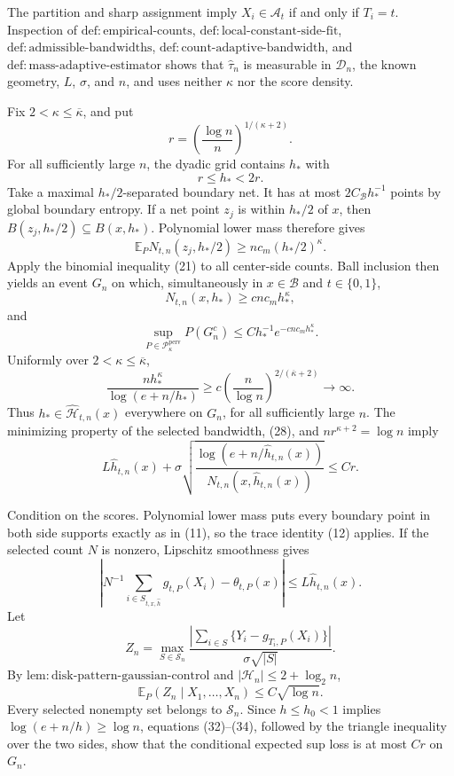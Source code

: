 The partition and sharp assignment imply \(X_i\in\mathcal A_t\) if and only if \(T_i=t\).  Inspection of \(\mathrm{def:empirical\text{-}counts}\), \(\mathrm{def:local\text{-}constant\text{-}side\text{-}fit}\), \(\mathrm{def:admissible\text{-}bandwidths}\), \(\mathrm{def:count\text{-}adaptive\text{-}bandwidth}\), and \(\mathrm{def:mass\text{-}adaptive\text{-}estimator}\) shows that \(\widehat\tau_n\) is measurable in \(\mathcal D_n\), the known geometry, \(L\), \(\sigma\), and \(n\), and uses neither \(\kappa\) nor the score density.

Fix \(2<\kappa\le\overline\kappa\), and put
\[
 r=\left(\frac{\log n}{n}\right)^{1/(\kappa+2)}.
\]
For all sufficiently large \(n\), the dyadic grid contains \(h_*\) with
\[
 r\le h_*<2r. \tag{28}
\]
Take a maximal \(h_*/2\)-separated boundary net.  It has at most \(2C_{\mathcal B}h_*^{-1}\) points by global boundary entropy.  If a net point \(z_j\) is within \(h_*/2\) of \(x\), then \(B(z_j,h_*/2)\subseteq B(x,h_*)\).  Polynomial lower mass therefore gives
\[
 \mathbb E_PN_{t,n}(z_j,h_*/2)\ge nc_m(h_*/2)^{\kappa}. \tag{29}
\]
Apply the binomial inequality (21) to all center-side counts.  Ball inclusion then yields an event \(G_n\) on which, simultaneously in \(x\in\mathcal B\) and \(t\in\{0,1\}\),
\[
 N_{t,n}(x,h_*)\ge c nc_mh_*^{\kappa},
\]
and
\[
 \sup_{P\in\mathcal P_{\kappa}^{\mathrm{perv}}}P(G_n^c)
 \le Ch_*^{-1}e^{-cnc_mh_*^{\kappa}}. \tag{30}
\]
Uniformly over \(2<\kappa\le\overline\kappa\),
\[
 \frac{nh_*^{\kappa}}{\log(e+n/h_*)}
 \ge c\left(\frac n{\log n}\right)^{2/(\overline\kappa+2)}\longrightarrow\infty. \tag{31}
\]
Thus \(h_*\in\widehat{\mathcal H}_{t,n}(x)\) everywhere on \(G_n\), for all sufficiently large \(n\).  The minimizing property of the selected bandwidth, (28), and \(nr^{\kappa+2}=\log n\) imply
\[
 L\widehat h_{t,n}(x)+\sigma\sqrt{\frac{\log(e+n/\widehat h_{t,n}(x))}{N_{t,n}(x,\widehat h_{t,n}(x))}}
 \le Cr. \tag{32}
\]

Condition on the scores.  Polynomial lower mass puts every boundary point in both side supports exactly as in (11), so the trace identity (12) applies.  If the selected count \(N\) is nonzero, Lipschitz smoothness gives
\[
 \left|N^{-1}\sum_{i\in S_{t,x,\widehat h}}g_{t,P}(X_i)-\theta_{t,P}(x)\right|
 \le L\widehat h_{t,n}(x). \tag{33}
\]
Let
\[
 Z_n=\max_{S\in\mathscr S_n}
 \frac{|\sum_{i\in S}\{Y_i-g_{T_i,P}(X_i)\}|}{\sigma\sqrt{|S|}}.
\]
By \(\mathrm{lem:disk\text{-}pattern\text{-}gaussian\text{-}control}\) and \(|\mathcal H_n|\le2+\log_2n\),
\[
 \mathbb E_P(Z_n\mid X_1,\ldots,X_n)\le C\sqrt{\log n}. \tag{34}
\]
Every selected nonempty set belongs to \(\mathscr S_n\).  Since \(h\le h_0<1\) implies \(\log(e+n/h)\ge\log n\), equations (32)--(34), followed by the triangle inequality over the two sides, show that the conditional expected sup loss is at most \(Cr\) on \(G_n\).

